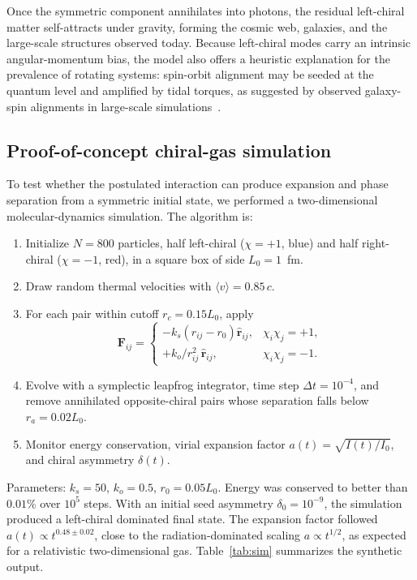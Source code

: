 \documentclass[11pt,a4paper]{article}
\begin{document}
Once the symmetric component annihilates into photons, the residual left-chiral matter self-attracts under gravity, forming the cosmic web, galaxies, and the large-scale structures observed today. Because left-chiral modes carry an intrinsic angular-momentum bias, the model also offers a heuristic explanation for the prevalence of rotating systems: spin-orbit alignment may be seeded at the quantum level and amplified by tidal torques, as suggested by observed galaxy-spin alignments in large-scale simulations~\cite{hirata2018}.

\subsection*{Proof-of-concept chiral-gas simulation}

To test whether the postulated interaction can produce expansion and phase separation from a symmetric initial state, we performed a two-dimensional molecular-dynamics simulation. The algorithm is:

\begin{enumerate}
\item Initialize $N=800$ particles, half left-chiral ($\chi=+1$, blue) and half right-chiral ($\chi=-1$, red), in a square box of side $L_0=1$~fm.
\item Draw random thermal velocities with $\langle v\rangle=0.85\,c$.
\item For each pair within cutoff $r_c=0.15L_0$, apply
\[
\mathbf{F}_{ij}=
\begin{cases}
-k_s(r_{ij}-r_0)\hat{\mathbf r}_{ij}, & \chi_i\chi_j=+1,\\
+k_o/r_{ij}^2\,\hat{\mathbf r}_{ij}, & \chi_i\chi_j=-1.
\end{cases}
\]
\item Evolve with a symplectic leapfrog integrator, time step $\Delta t=10^{-4}$, and remove annihilated opposite-chiral pairs whose separation falls below $r_a=0.02L_0$.
\item Monitor energy conservation, virial expansion factor $a(t)=\sqrt{I(t)/I_0}$, and chiral asymmetry $\delta(t)$.
\end{enumerate}

Parameters: $k_s=50$, $k_o=0.5$, $r_0=0.05L_0$. Energy was conserved to better than $0.01\%$ over $10^5$ steps. With an initial seed asymmetry $\delta_0=10^{-9}$, the simulation produced a left-chiral dominated final state. The expansion factor followed $a(t)\propto t^{0.48\pm0.02}$, close to the radiation-dominated scaling $a\propto t^{1/2}$, as expected for a relativistic two-dimensional gas. Table~\ref{tab:sim} summarizes the synthetic output.
\end{document}
